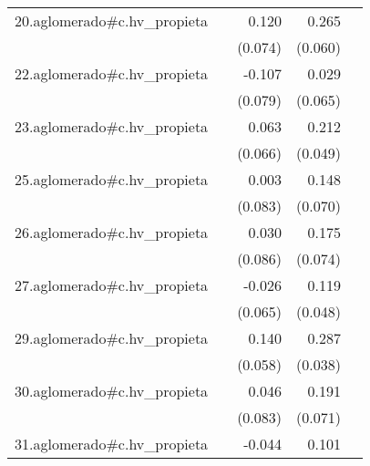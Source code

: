 {\begin{longtable}{l*{4}{D{.}{.}{-1}}}
\addlinespace
20.aglomerado#c.hv\_propieta&                     &       0.120         &       0.265\sym{***}&                     \\
            &                     &     (0.074)         &     (0.060)         &                     \\
\addlinespace
22.aglomerado#c.hv\_propieta&                     &      -0.107         &       0.029         &                     \\
            &                     &     (0.079)         &     (0.065)         &                     \\
\addlinespace
23.aglomerado#c.hv\_propieta&                     &       0.063         &       0.212\sym{***}&                     \\
            &                     &     (0.066)         &     (0.049)         &                     \\
\addlinespace
25.aglomerado#c.hv\_propieta&                     &       0.003         &       0.148\sym{*}  &                     \\
            &                     &     (0.083)         &     (0.070)         &                     \\
\addlinespace
26.aglomerado#c.hv\_propieta&                     &       0.030         &       0.175\sym{*}  &                     \\
            &                     &     (0.086)         &     (0.074)         &                     \\
\addlinespace
27.aglomerado#c.hv\_propieta&                     &      -0.026         &       0.119\sym{*}  &                     \\
            &                     &     (0.065)         &     (0.048)         &                     \\
\addlinespace
29.aglomerado#c.hv\_propieta&                     &       0.140\sym{*}  &       0.287\sym{***}&                     \\
            &                     &     (0.058)         &     (0.038)         &                     \\
\addlinespace
30.aglomerado#c.hv\_propieta&                     &       0.046         &       0.191\sym{**} &                     \\
            &                     &     (0.083)         &     (0.071)         &                     \\
\addlinespace
31.aglomerado#c.hv\_propieta&                     &      -0.044         &       0.101         &                     \\

\end{longtable}}
